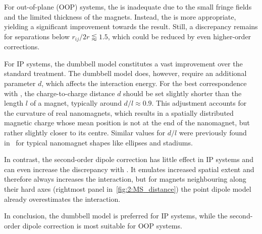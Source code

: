 For out-of-plane (OOP) systems, the  is inadequate due to the small fringe fields and the limited thickness of the magnets.
Instead, the  is more appropriate, yielding a significant improvement towards the \mumax result.
Still, a discrepancy remains for separations below $r_{ij}/2r \lessapprox 1.5$, which could be reduced by even higher-order corrections. \\\par

For IP systems, the dumbbell model constitutes a vast improvement over the standard  treatment.
The dumbbell model does, however, require an additional parameter $d$, which affects the interaction energy.
For the best correspondence with \mumax, the charge-to-charge distance $d$ should be set slightly shorter than the length $l$ of a magnet, typically around $d/l\approx0.9$. %
This adjustment accounts for the curvature of real nanomagnets, which results in a spatially distributed magnetic charge whose mean position is not at the end of the nanomagnet, but rather slightly closer to its centre.
Similar values for $d/l$ were previously found in~ for typical nanomagnet shapes like ellipses and stadiums. \par
In contrast, the second-order dipole correction has little effect in IP systems and can even increase the discrepancy with \mumax.
It emulates increased spatial extent and therefore always increases the interaction, but for magnets neighbouring along their hard axes (rightmost panel in~\cref{fig:2:MS_distance}) the point dipole model already overestimates the interaction. \par
In conclusion, the dumbbell model is preferred for IP systems, while the second-order dipole correction is most suitable for OOP systems.

